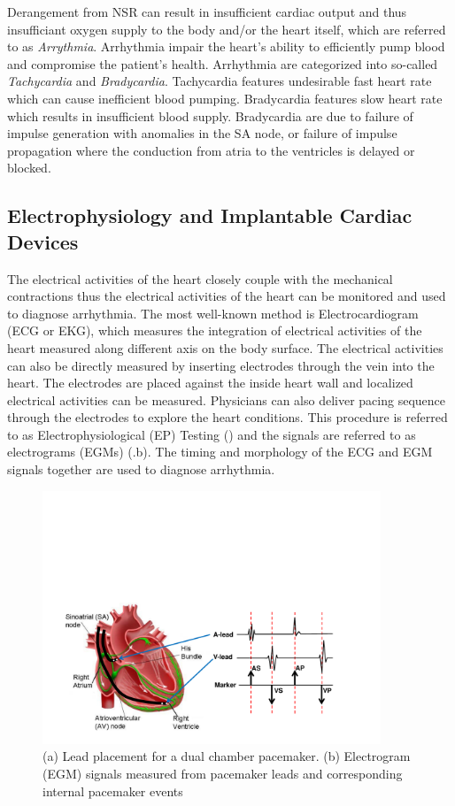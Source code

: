 Derangement from NSR can result in insufficient cardiac output and thus insufficiant oxygen supply to the body and/or the heart itself, which are referred to as \emph{Arrythmia}. Arrhythmia impair the heart's ability to efficiently pump blood and compromise the patient's health. 
Arrhythmia are categorized into so-called \emph{Tachycardia} and \emph{Bradycardia}. Tachycardia features undesirable fast heart rate which can cause inefficient blood pumping. Bradycardia features slow heart rate which results in insufficient blood supply. Bradycardia are due to failure of impulse generation with anomalies in the SA node, or failure of impulse propagation where the conduction from atria to the ventricles is delayed or blocked. 
\subsection{Electrophysiology and Implantable Cardiac Devices}
\label{EP}
The electrical activities of the heart closely couple with the mechanical contractions thus the electrical activities of the heart can be monitored and used to diagnose arrhythmia. The most well-known method is Electrocardiogram (ECG or EKG), which measures the integration of electrical activities of the heart measured along different axis on the body surface. The electrical activities can also be directly measured by inserting electrodes through the vein into the heart. The electrodes are placed against the inside heart wall and localized electrical activities can be measured. Physicians can also deliver pacing sequence through the electrodes to explore the heart conditions. This procedure is referred to as Electrophysiological (EP) Testing  (\cite{josephson}) and the signals are referred to as electrograms (EGMs) (.b). The timing and morphology of the  ECG and EGM signals together are used to diagnose arrhythmia.
\begin{figure}[!t]
\centering
		\includegraphics[width=0.9\textwidth]{figs/egm.pdf}
		
\caption{\small (a) Lead placement for a dual chamber pacemaker. (b) Electrogram (EGM) signals measured from pacemaker leads and corresponding internal pacemaker events}
\label{fig:probes}
\end{figure} 

